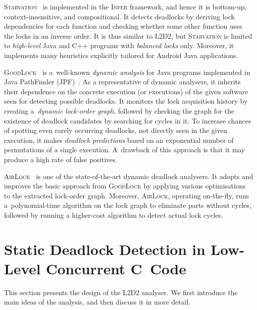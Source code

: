\documentclass[runningheads]{llncs}
\newcommand{\LLDD}{\textsc{L2D2}\xspace} %
\newcommand{\Infer}{\textsc{Infer}\xspace}
\newcommand{\GoodLock}{\textsc{GoodLock}\xspace}
\newcommand{\AirLock}{\textsc{AirLock}\xspace}
\begin{document}
\textsc{Starvation}~\cite{deadlock-nikos21} is implemented in the \Infer
framework, and hence it is bottom-up, context-insensitive, and compositional.
%
%
It detects deadlocks by deriving lock dependencies for each function and
checking whether some other function uses the locks in an inverse order. It is
thus similar to \LLDD, but \textsc{Starvation} is limited to \emph{high-level}
Java and C++ programs with \emph{balanced locks} only. Moreover, it implements
many heuristics explicitly tailored for Android Java applications.

\GoodLock~\cite{goodlock00} is a~well-known \emph{dynamic analysis} for Java
programs implemented in Java PathFinder (JPF)~\cite{jpf00}. As a representative
of dynamic analysers, it inherits their dependence on the concrete execution (or
executions) of the given software seen for detecting possible deadlocks. It
monitors the lock acquisition history by creating a~\emph{dynamic lock-order
graph}, followed by checking the graph for the existence of deadlock candidates
by searching for cycles in it. To increase chances of spotting even rarely
occurring deadlocks, not directly seen in the given execution, it makes
\emph{deadlock predictions} based on an exponential number of permutations of a
single execution. A~drawback of this approach is that it may produce a high rate
of false positives.

\AirLock~\cite{airlock20} is one of the state-of-the-art dynamic deadlock
analysers. It adopts and improves the basic approach from \GoodLock by applying
various optimisations to the extracted lock-order graph. Moreover, \AirLock,
operating on-the-fly, runs a~polynomial-time algorithm on the lock graph to
eliminate parts without cycles, followed by running a higher-cost algorithm to
detect actual lock cycles.

\vspace*{-3mm}\section{Static Deadlock Detection in Low-Level Concurrent
C~Code}\vspace*{-2mm} \label{sec:l2d2}

This section presents the design of the \LLDD analyser. We first introduce the
main ideas of the analysis, and then discuss it in more detail.
\end{document}
